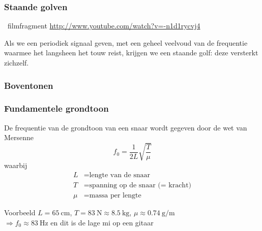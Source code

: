 \documentclass[compress, darktitle, framenumber, totalframenumber, handout]{beamer}
\begin{document}
\begin{frame}
  \frametitle{Staande golven}

  \begin{block}{\Forward\ filmfragment}
    \url{http://www.youtube.com/watch?v=-n1d1rycvj4}
  \end{block}

  \pause

  Als we een periodiek signaal geven, met een geheel veelvoud van de frequentie waarmee het langsheen het touw reist, krijgen we een \alert{staande golf}: deze versterkt zichzelf.
\end{frame}

\begin{frame}
  \frametitle{Boventonen}

  \centering
\end{frame}

\begin{frame}
  \frametitle{Fundamentele grondtoon}

  De frequentie van de grondtoon van een snaar wordt gegeven door de \alert{wet van Mersenne}
  \begin{equation}
    f_0=\frac{1}{2L}\sqrt{\frac{T}{\mu}}
  \end{equation}
  waarbij
  \begin{equation}
    \begin{aligned}
      L&=\text{lengte van de snaar} \\
      T&=\text{spanning op de snaar (= kracht)} \\
      \mu&=\text{massa per lengte}
    \end{aligned}
  \end{equation}
  \pause
  \begin{block}{Voorbeeld}
    $L=\SI{65}{\centi\meter}$, $T=\SI{83}{\newton}\approx\SI{8.5}{\kilo\gram}$, $\mu\approx\SI{0.74}{\gram\per\meter}$ \\
    $\Rightarrow f_0\approx\SI{83}{\hertz}$ en dit is de lage mi op een gitaar
  \end{block}
\end{frame}
\end{document}

